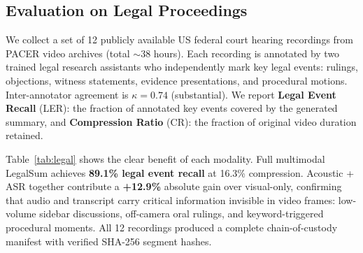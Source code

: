 \documentclass[letterpaper]{article} %
\begin{document}
\subsection{Evaluation on Legal Proceedings}

We collect a set of 12 publicly available US federal court hearing recordings from PACER video archives (total $\sim$38 hours). Each recording is annotated by two trained legal research assistants who independently mark key legal events: rulings, objections, witness statements, evidence presentations, and procedural motions. Inter-annotator agreement is $\kappa = 0.74$ (substantial). We report \textbf{Legal Event Recall} (LER): the fraction of annotated key events covered by the generated summary, and \textbf{Compression Ratio} (CR): the fraction of original video duration retained.

\begin{table}[t]
\centering
\caption{Legal proceedings evaluation on 12 public US federal court recordings (38 hrs, 2 annotators, $\kappa=0.74$). LER = Legal Event Recall. Higher LER and lower CR are better.}
\label{tab:legal}
\end{table}

Table~\ref{tab:legal} shows the clear benefit of each modality. Full multimodal LegalSum achieves \textbf{89.1\% legal event recall} at 16.3\% compression. Acoustic + ASR together contribute a \textbf{+12.9\%} absolute gain over visual-only, confirming that audio and transcript carry critical information invisible in video frames: low-volume sidebar discussions, off-camera oral rulings, and keyword-triggered procedural moments. All 12 recordings produced a complete chain-of-custody manifest with verified SHA-256 segment hashes.
\end{document}
